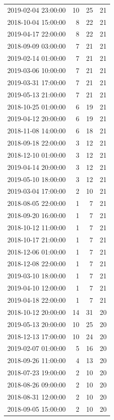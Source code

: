 \begin{tabular}{lrrr}
2019-02-04 23:00:00 & 10 & 25 & 21 \\
2018-10-04 15:00:00 & 8 & 22 & 21 \\
2019-04-17 22:00:00 & 8 & 22 & 21 \\
2018-09-09 03:00:00 & 7 & 21 & 21 \\
2019-02-14 01:00:00 & 7 & 21 & 21 \\
2019-03-06 10:00:00 & 7 & 21 & 21 \\
2019-03-31 17:00:00 & 7 & 21 & 21 \\
2019-05-13 21:00:00 & 7 & 21 & 21 \\
2018-10-25 01:00:00 & 6 & 19 & 21 \\
2019-04-12 20:00:00 & 6 & 19 & 21 \\
2018-11-08 14:00:00 & 6 & 18 & 21 \\
2018-09-18 22:00:00 & 3 & 12 & 21 \\
2018-12-10 01:00:00 & 3 & 12 & 21 \\
2019-04-14 20:00:00 & 3 & 12 & 21 \\
2019-05-10 18:00:00 & 3 & 12 & 21 \\
2019-03-04 17:00:00 & 2 & 10 & 21 \\
2018-08-05 22:00:00 & 1 & 7 & 21 \\
2018-09-20 16:00:00 & 1 & 7 & 21 \\
2018-10-12 11:00:00 & 1 & 7 & 21 \\
2018-10-17 21:00:00 & 1 & 7 & 21 \\
2018-12-06 01:00:00 & 1 & 7 & 21 \\
2018-12-08 22:00:00 & 1 & 7 & 21 \\
2019-03-10 18:00:00 & 1 & 7 & 21 \\
2019-04-10 12:00:00 & 1 & 7 & 21 \\
2019-04-18 22:00:00 & 1 & 7 & 21 \\
2018-10-12 20:00:00 & 14 & 31 & 20 \\
2019-05-13 20:00:00 & 10 & 25 & 20 \\
2018-12-13 17:00:00 & 10 & 24 & 20 \\
2019-02-07 01:00:00 & 5 & 16 & 20 \\
2018-09-26 11:00:00 & 4 & 13 & 20 \\
2018-07-23 19:00:00 & 2 & 10 & 20 \\
2018-08-26 09:00:00 & 2 & 10 & 20 \\
2018-08-31 12:00:00 & 2 & 10 & 20 \\
2018-09-05 15:00:00 & 2 & 10 & 20 \\

\end{tabular}
